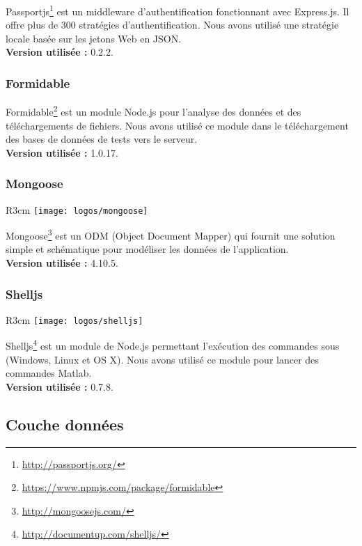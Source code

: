 Passportjs\footnote{\href{http://passportjs.org/}{http://passportjs.org/}} est un middleware d'authentification fonctionnant avec Express.js. Il offre plus de 300 stratégies d’authentification. Nous avons utilisé une stratégie locale basée sur les jetons Web en JSON.\\
\textbf{Version utilisée :} 0.2.2.
\subsubsection{Formidable}

Formidable\footnote{\href{https://www.npmjs.com/package/formidable}{https://www.npmjs.com/package/formidable}} est un module Node.js pour l'analyse des données et des téléchargements de fichiers. Nous avons utilisé ce module dans le téléchargement des bases de données de tests vers le serveur.\\
\textbf{Version utilisée :} 1.0.17.
\subsubsection{Mongoose}
\begin{wrapfigure}{R}{3cm}	\vspace{-20px}
	\texttt{[image: logos/mongoose]}
\end{wrapfigure} 
Mongoose\footnote{\href{http://mongoosejs.com/}{http://mongoosejs.com/}} est un ODM (Object Document Mapper) qui fournit une solution simple et schématique pour modéliser les données de l’application.\\
\textbf{Version utilisée :} 4.10.5.
\subsubsection{Shelljs}
\begin{wrapfigure}{R}{3cm}
	\vspace{-30px}
	\texttt{[image: logos/shelljs]}
	
\end{wrapfigure} 

Shelljs\footnote{\href{http://documentup.com/shelljs/shelljs}{http://documentup.com/shelljs/}} est un module de Node.js permettant l’exécution des commandes sous (Windows, Linux et OS X). Nous avons utilisé ce module pour lancer des commandes Matlab.\\
\textbf{Version utilisée :} 0.7.8.



\subsection{Couche données}

